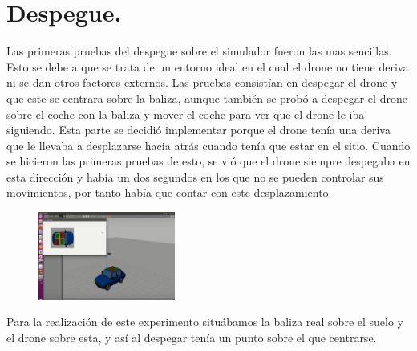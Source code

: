 \section{Despegue.}

\hspace{1cm} Las primeras pruebas del despegue sobre el simulador fueron las mas sencillas. Esto se debe a que se trata de un entorno ideal en el cual el drone no tiene deriva ni se dan otros factores externos. Las pruebas consist\'ian en despegar el drone y que este se centrara sobre la baliza, aunque tambi\'en se prob\'o a despegar el drone sobre el coche con la baliza y mover el coche para ver que el drone le iba siguiendo. Esta parte se decidi\'o implementar porque el drone ten\'ia una deriva que le llevaba a desplazarse hacia atr\'as cuando ten\'ia que estar en el sitio. Cuando se hicieron las primeras pruebas de esto, se vi\'o que el drone siempre despegaba en esta direcci\'on y hab\'ia un dos segundos en los que no se pueden controlar sus movimientos, por tanto hab\'ia que contar con este desplazamiento.
\begin{figure}[H]
	\centering
		\includegraphics[width=0.4\textwidth]{imgs/TakeOff.jpg}
	\label{fig:Despegue sobre la baliza del coche.}
\end{figure}


\hspace{1cm} Para la realizaci\'on de este experimento situ\'abamos la baliza real sobre el suelo y el drone sobre esta, y as\'i al despegar ten\'ia un punto sobre el que centrarse. 

